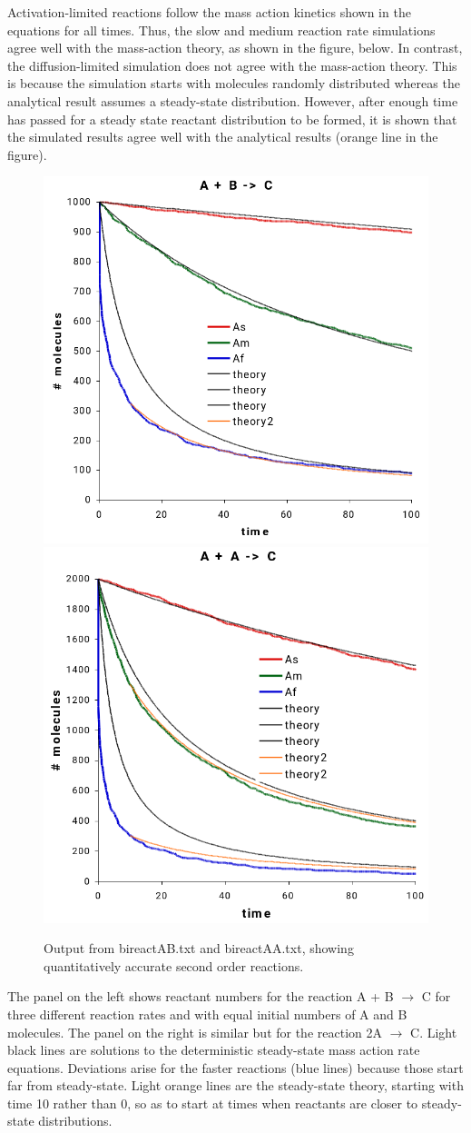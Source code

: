 \documentclass {scrbook}
\begin{document}
Activation-limited reactions follow the mass action kinetics shown in the equations for all times. Thus, the slow and medium reaction rate simulations agree well with the mass-action theory, as shown in the figure, below. In contrast, the diffusion-limited simulation does not agree with the mass-action theory. This is because the simulation starts with molecules randomly distributed whereas the analytical result assumes a steady-state distribution. However, after enough time has passed for a steady state reactant distribution to be formed, it is shown that the simulated results agree well with the analytical results (orange line in the figure).

\begin{figure}[h]
\centering
\includegraphics[height=5 cm]{figures/image38.png}
\includegraphics[height=5 cm]{figures/image39.png}
\caption{Output from bireactAB.txt and bireactAA.txt, showing quantitatively accurate second order reactions.}
\label{fig:bireactAB}
\end{figure}

The panel on the left shows reactant numbers for the reaction A + B $\rightarrow$ C for three different reaction rates and with equal initial numbers of A and B molecules. The panel on the right is similar but for the reaction 2A $\rightarrow$ C. Light black lines are solutions to the deterministic steady-state mass action rate equations. Deviations arise for the faster reactions (blue lines) because those start far from steady-state. Light orange lines are the steady-state theory, starting with time 10 rather than 0, so as to start at times when reactants are closer to steady-state distributions.
\end{document}
